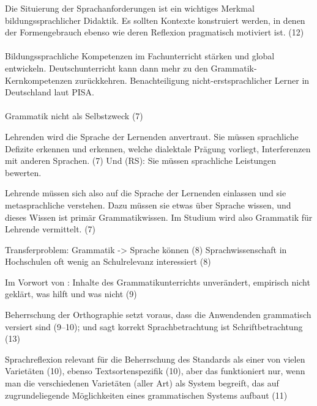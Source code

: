 Die Situierung der Sprachanforderungen ist ein wichtiges Merkmal bildungssprachlicher Didaktik. Es sollten Kontexte konstruiert werden, in denen der Formengebrauch ebenso wie deren Reflexion pragmatisch motiviert ist. (12)

\paragraph*{\citet{Schroeterbrauss2013}}

Bildungssprachliche Kompetenzen im Fachunterricht stärken und global entwickeln.
Deutschunterricht kann dann mehr zu den Grammatik-Kernkompetenzen zurückkehren.
Benachteiligung nicht-erstsprachlicher Lerner in Deutschland laut PISA.

\paragraph*{\citet{Eisenberg2013c}}

Grammatik nicht als Selbstzweck (7)

Lehrenden wird die Sprache der Lernenden anvertraut.
Sie müssen sprachliche Defizite erkennen und erkennen, welche dialektale Prägung vorliegt, Interferenzen mit anderen Sprachen. (7) Und (RS): Sie müssen sprachliche Leistungen bewerten.

Lehrende müssen sich also auf die Sprache der Lernenden einlassen und sie metasprachliche verstehen.
Dazu müssen sie etwas über Sprache wissen, und dieses Wissen ist primär Grammatikwissen.
Im Studium wird also Grammatik für Lehrende vermittelt. (7)

Transferproblem: Grammatik -> Sprache können (8)
Sprachwissenschaft in Hochschulen oft wenig an Schulrelevanz interessiert (8)

Im Vorwort von \citet[2]{KoepckeZiegler2013}: Inhalte des Grammatikunterrichts unverändert, empirisch nicht geklärt, was hilft und was nicht (9)

Beherrschung der Orthographie setzt voraus, dass die Anwendenden grammatisch versiert sind (9--10); und \citet{Duerscheid2013} sagt korrekt Sprachbetrachtung ist Schriftbetrachtung (13)

Sprachreflexion relevant für die Beherrschung des Standards als einer von vielen Varietäten (10), ebenso Textsortenspezifik (10), aber das funktioniert nur, wenn man die verschiedenen Varietäten (aller Art) als System begreift, das auf zugrundeliegende Möglichkeiten eines grammatischen Systems aufbaut (11)

